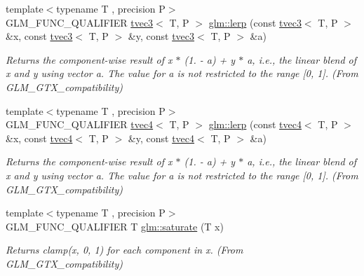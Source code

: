 \begin{DoxyCompactItemize}
{\footnotesize template$<$typename T , precision P$>$ }\\G\+L\+M\+\_\+\+F\+U\+N\+C\+\_\+\+Q\+U\+A\+L\+I\+F\+I\+ER \hyperlink{structglm_1_1tvec3}{tvec3}$<$ T, P $>$ \hyperlink{group__gtx__compatibility_ga90a1d1364a8d078846857178bdcc9af1}{glm\+::lerp} (const \hyperlink{structglm_1_1tvec3}{tvec3}$<$ T, P $>$ \&x, const \hyperlink{structglm_1_1tvec3}{tvec3}$<$ T, P $>$ \&y, const \hyperlink{structglm_1_1tvec3}{tvec3}$<$ T, P $>$ \&a)
\begin{DoxyCompactList}\small\item\em Returns the component-\/wise result of x $\ast$ (1. -\/ a) + y $\ast$ a, i.\+e., the linear blend of x and y using vector a. The value for a is not restricted to the range \mbox{[}0, 1\mbox{]}. (From G\+L\+M\+\_\+\+G\+T\+X\+\_\+compatibility) \end{DoxyCompactList}\item 
\mbox{\label{group__gtx__compatibility_gae4b0244b0d882657bed0a99dfa33f379}} 
{\footnotesize template$<$typename T , precision P$>$ }\\G\+L\+M\+\_\+\+F\+U\+N\+C\+\_\+\+Q\+U\+A\+L\+I\+F\+I\+ER \hyperlink{structglm_1_1tvec4}{tvec4}$<$ T, P $>$ \hyperlink{group__gtx__compatibility_gae4b0244b0d882657bed0a99dfa33f379}{glm\+::lerp} (const \hyperlink{structglm_1_1tvec4}{tvec4}$<$ T, P $>$ \&x, const \hyperlink{structglm_1_1tvec4}{tvec4}$<$ T, P $>$ \&y, const \hyperlink{structglm_1_1tvec4}{tvec4}$<$ T, P $>$ \&a)
\begin{DoxyCompactList}\small\item\em Returns the component-\/wise result of x $\ast$ (1. -\/ a) + y $\ast$ a, i.\+e., the linear blend of x and y using vector a. The value for a is not restricted to the range \mbox{[}0, 1\mbox{]}. (From G\+L\+M\+\_\+\+G\+T\+X\+\_\+compatibility) \end{DoxyCompactList}\item 
\mbox{\label{group__gtx__compatibility_ga0fd09e616d122bc2ed9726682ffd44b7}} 
{\footnotesize template$<$typename T , precision P$>$ }\\G\+L\+M\+\_\+\+F\+U\+N\+C\+\_\+\+Q\+U\+A\+L\+I\+F\+I\+ER T \hyperlink{group__gtx__compatibility_ga0fd09e616d122bc2ed9726682ffd44b7}{glm\+::saturate} (T x)
\begin{DoxyCompactList}\small\item\em Returns clamp(x, 0, 1) for each component in x. (From G\+L\+M\+\_\+\+G\+T\+X\+\_\+compatibility) \end{DoxyCompactList}\item 

\end{DoxyCompactItemize}
